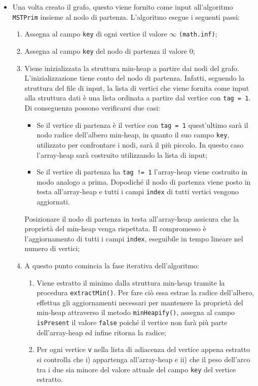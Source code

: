 \begin{itemize}
	\item Una volta creato il grafo, questo viene fornito come input all'algoritmo \texttt{MSTPrim} insieme al nodo di partenza. 
	L'algoritmo esegue i seguenti passi:
	\begin{enumerate}
		\item Assegna al campo \texttt{key} di ogni vertice il valore $\infty$ \texttt{(math.inf)};
		\item Assegna al campo \texttt{key} del nodo di partenza il valore $0$;
		\item Viene inizializzata la struttura min-heap a partire dai nodi del grafo. 
		L'inizializzazione tiene conto del nodo di partenza. 
		Infatti, seguendo la struttura del file di input, la lista di vertici che viene fornita come input alla struttura dati è una lista ordinata a partire dal vertice con \texttt{tag = 1}. 
		Di conseguenza possono verificarsi due casi:
		\begin{itemize}
			\item Se il vertice di partenza è il vertice con \texttt{tag = 1} quest'ultimo sarà il nodo radice dell'albero min-heap, in quanto il suo campo \texttt{key}, utilizzato per confrontare i nodi, sarà il più piccolo. 
			In questo caso l'array-heap sarà costruito utilizzando la lista di input;
			\item Se il vertice di partenza ha \texttt{tag != 1} l'array-heap viene costruito in modo analogo a prima. 
			Dopodiché il nodo di partenza viene posto in testa all'array-heap e tutti i campi \texttt{index} di tutti vertici vengono aggiornati.
		\end{itemize}
		Posizionare il nodo di partenza in testa all'array-heap assicura che la proprietà del min-heap venga rispettata. 
		Il compromesso è l'aggiornamento di tutti i campi \texttt{index}, eseguibile in tempo lineare nel numero di vertici;
		\item A questo punto comincia la fase iterativa dell'algoritmo:
		\begin{enumerate}
			\item Viene estratto il minimo dalla struttura min-heap tramite la procedura \texttt{extractMin()}. 
			Per fare ciò essa estrae la radice dell'albero, effettua gli aggiornamenti necessari per mantenere la proprietà del min-heap attraverso il metodo \texttt{minHeapify()}, assegna al campo \texttt{isPresent} il valore \texttt{false} poiché il vertice non farà più parte dell'array-heap ed infine ritorna la radice;
			\item Per ogni vertice \texttt{v} nella lista di adiacenza del vertice appena estratto si controlla che i) appartenga all'array-heap e ii) che il peso dell'arco tra i due sia minore del valore attuale del campo \texttt{key} del vertice estratto. 

\end{enumerate}
\end{enumerate}
\end{itemize}
